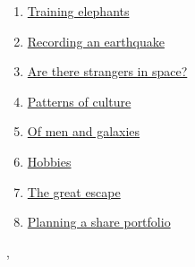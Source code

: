 \documentclass[11pt]{article}
\renewcommand{\today}{\shortmonthname[\the\month] \the \day,  \the\year}
\begin{document}
\begin{multicols}{2}
\begin{enumerate}
		\item \href{https://mp.weixin.qq.com/s/Gh4s_IkBBNalOnsoja2XCQ}{Training elephants}	%
		\item \href{https://mp.weixin.qq.com/s/UzsENn2BXlyesWZqftza_w}{Recording an earthquake}	%
		\item \href{https://mp.weixin.qq.com/s/B3D4BLWg4nO2xLLVhVbKjQ}{Are there strangers in space?}	%
		\item \href{https://mp.weixin.qq.com/s/8jiYpIPA0bmdzp1BfN9jzQ}{Patterns of culture}	%
		\item \href{https://mp.weixin.qq.com/s/gMzn-4lEBBICyGuhBWXOdw}{Of men and galaxies}	%
		\item \href{https://mp.weixin.qq.com/s/HveGB2ESw7mBeg1c7Peqdw}{Hobbies}	%
		\item \href{https://mp.weixin.qq.com/s/3tn_SyzB816BnKq7s8VQAQ}{The great escape}	%
		\item \href{https://mp.weixin.qq.com/s/huW4rVPRk8Vh94pziW5shg}{Planning a share portfolio}	%
	\end{enumerate}
\end{multicols}


%
\begin{flushright}
	\tiny \today 
\end{flushright}
\end{document}
